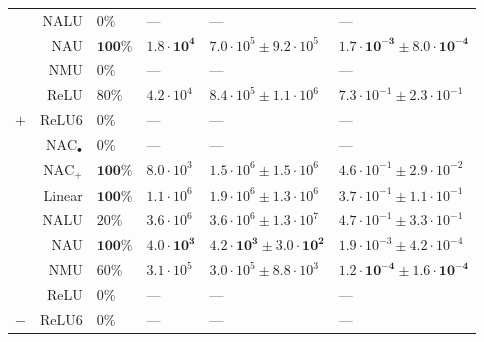 \begin{table}[!h]
\begin{tabular}{crllll}
 & NALU & $0\%$ & --- & --- & ---\\

 & NAU & $\mathbf{100\%}$ & $\mathbf{1.8 \cdot 10^{4}}$ & $7.0 \cdot 10^{5} \pm 9.2 \cdot 10^{5}$ & $\mathbf{1.7 \cdot 10^{-3} \pm 8.0 \cdot 10^{-4}}$\\

 & NMU & $0\%$ & --- & --- & ---\\

 & ReLU & $80\%$ & $4.2 \cdot 10^{4}$ & $8.4 \cdot 10^{5} \pm 1.1 \cdot 10^{6}$ & $7.3 \cdot 10^{-1} \pm 2.3 \cdot 10^{-1}$\\

\multirow{-8}{*}{\centering\arraybackslash $\bm{+}$} & ReLU6 & $0\%$ & --- & --- & ---\\
\cmidrule{1-6}
 & $\mathrm{NAC}_{\bullet}$ & $0\%$ & --- & --- & ---\\

 & $\mathrm{NAC}_{+}$ & $\mathbf{100\%}$ & $8.0 \cdot 10^{3}$ & $1.5 \cdot 10^{6} \pm 1.5 \cdot 10^{6}$ & $4.6 \cdot 10^{-1} \pm 2.9 \cdot 10^{-2}$\\

 & Linear & $\mathbf{100\%}$ & $1.1 \cdot 10^{6}$ & $1.9 \cdot 10^{6} \pm 1.3 \cdot 10^{6}$ & $3.7 \cdot 10^{-1} \pm 1.1 \cdot 10^{-1}$\\

 & NALU & $20\%$ & $3.6 \cdot 10^{6}$ & $3.6 \cdot 10^{6} \pm 1.3 \cdot 10^{7}$ & $4.7 \cdot 10^{-1} \pm 3.3 \cdot 10^{-1}$\\

 & NAU & $\mathbf{100\%}$ & $\mathbf{4.0 \cdot 10^{3}}$ & $\mathbf{4.2 \cdot 10^{3} \pm 3.0 \cdot 10^{2}}$ & $1.9 \cdot 10^{-3} \pm 4.2 \cdot 10^{-4}$\\

 & NMU & $60\%$ & $3.1 \cdot 10^{5}$ & $3.0 \cdot 10^{5} \pm 8.8 \cdot 10^{3}$ & $\mathbf{1.2 \cdot 10^{-4} \pm 1.6 \cdot 10^{-4}}$\\

 & ReLU & $0\%$ & --- & --- & ---\\

\multirow{-8}{*}{\centering\arraybackslash $\bm{-}$} & ReLU6 & $0\%$ & --- & --- & ---\\
\bottomrule
\end{tabular}
\end{table}
